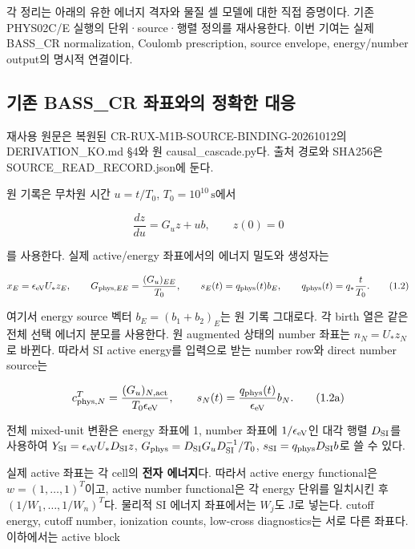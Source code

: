 각 정리는 아래의 유한 에너지 격자와 물질 셀 모델에 대한 직접 증명이다. 기존 PHYS02C/E 실행의 단위·source·행렬 정의를 재사용한다. 이번 기여는 실제 BASS\_CR normalization, Coulomb prescription, source envelope, energy/number output의 명시적 연결이다.

\hypertarget{uxae30uxc874-bass_cr-uxc88cuxd45cuxc640uxc758-uxc815uxd655uxd55c-uxb300uxc751}{%
\subsection{기존 BASS\_CR 좌표와의 정확한 대응}\label{uxae30uxc874-bass_cr-uxc88cuxd45cuxc640uxc758-uxc815uxd655uxd55c-uxb300uxc751}}

재사용 원문은 복원된 CR-RUX-M1B-SOURCE-BINDING-20261012의 DERIVATION\_KO.md §4와 원 causal\_cascade.py다. 출처 경로와 SHA256은 SOURCE\_READ\_RECORD.json에 둔다.

원 기록은 무차원 시간 \(u=t/T_0\), \(T_0=10^{10}\,\mathrm{s}\)에서

\[
\frac{dz}{du}=G_u z+u b,\qquad z(0)=0
\tag{1.1}
\]

를 사용한다. 실제 active/energy 좌표에서의 에너지 밀도와 생성자는

\[
x_E=\epsilon_{\rm eV}U_*z_E,\qquad
G_{{\rm phys},EE}=\frac{(G_u)_{EE}}{T_0},\qquad
s_E(t)=q_{\rm phys}(t)b_E,\qquad
q_{\rm phys}(t)=q_*\frac{t}{T_0}.
\tag{1.2}
\]

여기서 energy source 벡터 \(b_E=(b_1+b_2)_E\)는 원 기록 그대로다. 각 birth 열은 같은 전체 선택 에너지 분모를 사용한다. 원 augmented 상태의 number 좌표는 \(n_N=U_*z_N\)로 바뀐다. 따라서 SI active energy를 입력으로 받는 number row와 direct number source는

\[
c_{{\rm phys},N}^T=\frac{(G_u)_{N,\rm act}}{T_0\epsilon_{\rm eV}},
\qquad s_N(t)=\frac{q_{\rm phys}(t)}{\epsilon_{\rm eV}}b_N.
\tag{1.2a}
\]

전체 mixed-unit 변환은 energy 좌표에 1, number 좌표에 \(1/\epsilon_{\rm eV}\)인 대각 행렬 \(D_{\rm SI}\)를 사용하여 \(Y_{\rm SI}=\epsilon_{\rm eV}U_*D_{\rm SI}z\), \(G_{\rm phys}=D_{\rm SI}G_uD_{\rm SI}^{-1}/T_0\), \(s_{\rm SI}=q_{\rm phys}D_{\rm SI}b\)로 쓸 수 있다.

실제 active 좌표는 각 cell의 \textbf{전자 에너지}다. 따라서 active energy functional은 \(w=(1,\ldots,1)^T\)이고, active number functional은 각 energy 단위를 일치시킨 후 \((1/W_1,\ldots,1/W_n)^T\)다. 물리적 SI 에너지 좌표에서는 \(W_j\)도 J로 넣는다. cutoff energy, cutoff number, ionization counts, low-cross diagnostics는 서로 다른 좌표다. 이하에서는 active block

